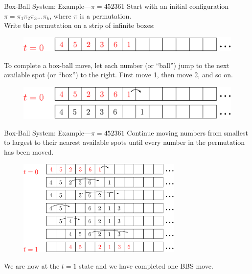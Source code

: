 \documentclass[aspectratio=169, serif]{beamer}
\begin{document}
    \begin{frame}{Box-Ball System: Example---$\pi=452361$}
    Start with an initial configuration $\pi=\pi_1\pi_2\pi_3...\pi_k$, where $\pi$ is a permutation.\\
        \RaggedRight
        \vspace{2mm}
        \phantom{---}Write the permutation on a strip of infinite boxes:\\
        \RaggedRight
        \begin{figure}[H]
            \centering
            \includegraphics[width = 5in]{Step_1.eps}
        \end{figure}
        
        \phantom{---}
        To complete a box-ball move,  let each number (or ``ball'') jump to the next available spot (or ``box'') to the right.  First move 1, then move 2, and so on.\\
        \begin{figure}[H]
            \centering
            \includegraphics[width = 5in]{Step2V2.eps}
        \end{figure}    
    \end{frame}
    \begin{frame}{Box-Ball System: Example---$\pi=452361$}
        \phantom{---}Continue moving numbers from smallest to largest to their nearest available spots until every number in the permutation has been moved. 
       
        \begin{figure}
            \centering
                \includegraphics[width = 3.2in]{Step3.eps}
        \end{figure}
We are now at the $t=1$ state and we have completed one BBS move.
    \end{frame}
\end{document}
